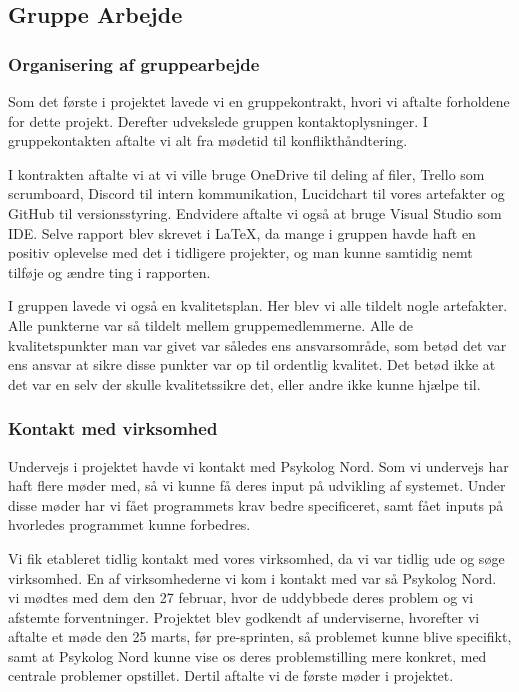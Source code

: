 \subsection{Gruppe Arbejde}
\subsubsection{Organisering af gruppearbejde}

Som det første i projektet lavede vi en gruppekontrakt, 
hvori vi aftalte forholdene for dette projekt. Derefter udvekslede gruppen kontaktoplysninger.
I gruppekontakten aftalte vi alt fra mødetid til konflikthåndtering.


I kontrakten aftalte vi at vi ville bruge OneDrive til deling af filer, Trello som scrumboard, Discord til intern kommunikation, Lucidchart til vores artefakter og GitHub til versionsstyring. 
Endvidere aftalte vi også
at bruge Visual Studio som IDE.
Selve rapport blev skrevet i \LaTeX, da mange i gruppen havde haft en positiv oplevelse med det i tidligere projekter, og man kunne samtidig nemt tilføje og ændre ting i rapporten.

I gruppen lavede vi også en kvalitetsplan. Her blev vi alle tildelt nogle artefakter. 
Alle punkterne var så tildelt mellem gruppemedlemmerne. Alle de kvalitetspunkter man var givet var således ens ansvarsområde, som betød det var ens ansvar at sikre disse punkter var op til ordentlig kvalitet. 
Det betød ikke at det var en selv der skulle kvalitetssikre det, eller andre ikke kunne hjælpe til.

\subsubsection{Kontakt med virksomhed}

Undervejs i projektet havde vi kontakt med Psykolog Nord. Som vi undervejs har haft flere møder med, så vi kunne få deres input på udvikling af systemet.
Under disse møder har vi fået programmets krav bedre specificeret, samt fået inputs på hvorledes programmet kunne forbedres.

Vi fik etableret tidlig kontakt med vores virksomhed, da vi var tidlig ude og søge virksomhed. En af virksomhederne vi kom i kontakt med var så Psykolog Nord. vi mødtes med dem den 27 februar, hvor de uddybbede deres problem og vi afstemte forventninger. Projektet blev godkendt af underviserne, hvorefter vi aftalte et møde den 25 marts, før pre-sprinten, så problemet kunne blive specifikt, samt at Psykolog Nord kunne vise os deres problemstilling mere konkret, med centrale problemer opstillet.
Dertil aftalte vi de første møder i projektet. 

